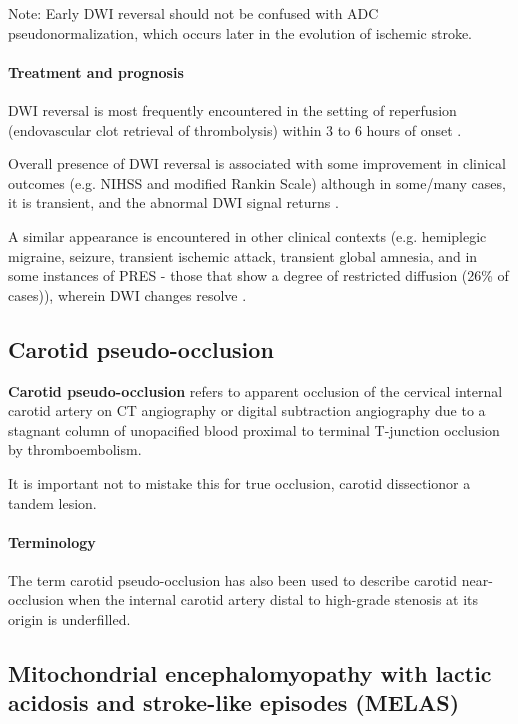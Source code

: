 Note: Early DWI reversal should not be confused with ADC pseudonormalization, which occurs later in the evolution of ischemic stroke.

\paragraph{Treatment and prognosis}

DWI reversal is most frequently encountered in the setting of reperfusion (endovascular clot retrieval of thrombolysis) within 3 to 6 hours of onset .

Overall presence of DWI reversal is associated with some improvement in clinical outcomes (e.g. NIHSS and modified Rankin Scale)  although in some/many cases, it is transient, and the abnormal DWI signal returns .

\begin{tcolorbox}[colback=green!5!white,colframe=green!75!black,title=Differential diagnosis]
	A similar appearance is encountered in other clinical contexts (e.g. hemiplegic migraine, seizure, transient ischemic attack, transient global amnesia, and in some instances of PRES - those that show a degree of restricted diffusion (26\% of cases)), wherein DWI changes resolve .
\end{tcolorbox}
	
\subsection{Carotid pseudo-occlusion}

\textbf{Carotid pseudo-occlusion} refers to apparent occlusion of the cervical internal carotid artery on CT angiography or digital subtraction angiography due to a stagnant column of unopacified blood proximal to terminal T-junction occlusion by thromboembolism.

It is important not to mistake this for true occlusion, carotid dissectionor a tandem lesion.

\paragraph{Terminology}

The term carotid pseudo-occlusion has also been used to describe carotid near-occlusion when the internal carotid artery distal to high-grade stenosis at its origin is underfilled.
\subsection{Mitochondrial encephalomyopathy with lactic acidosis and stroke-like episodes (MELAS)}

